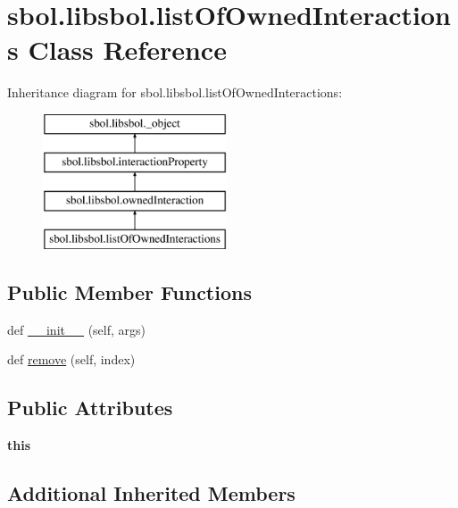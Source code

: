 \hypertarget{classsbol_1_1libsbol_1_1list_of_owned_interactions}{}\section{sbol.\+libsbol.\+list\+Of\+Owned\+Interactions Class Reference}
\label{classsbol_1_1libsbol_1_1list_of_owned_interactions}
Inheritance diagram for sbol.\+libsbol.\+list\+Of\+Owned\+Interactions\+:\begin{figure}[H]
\begin{center}
\leavevmode
\includegraphics[height=4.000000cm]{classsbol_1_1libsbol_1_1list_of_owned_interactions}
\end{center}
\end{figure}
\subsection*{Public Member Functions}
\begin{DoxyCompactItemize}
\item 
def \hyperlink{classsbol_1_1libsbol_1_1list_of_owned_interactions_a81b00321a0ec3ee210a57a41ddbac656}{\+\_\+\+\_\+init\+\_\+\+\_\+} (self, args)
\item 
def \hyperlink{classsbol_1_1libsbol_1_1list_of_owned_interactions_ac57156b5a021974626617e4e5775f6aa}{remove} (self, index)
\end{DoxyCompactItemize}
\subsection*{Public Attributes}
\begin{DoxyCompactItemize}
\item 
{\bfseries this}\hypertarget{classsbol_1_1libsbol_1_1list_of_owned_interactions_aed8ac6dcc8c52f7901b8eda1b0358f03}{}\label{classsbol_1_1libsbol_1_1list_of_owned_interactions_aed8ac6dcc8c52f7901b8eda1b0358f03}

\end{DoxyCompactItemize}
\subsection*{Additional Inherited Members}



